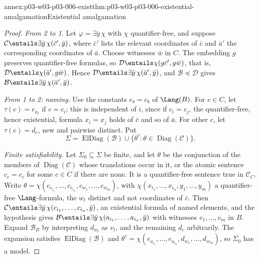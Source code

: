 \begin{annexitem}{annex:p03-w03-p03-006-exist}{thm:p03-w03-p03-006-existential-amalgamation}{Existential amalgamation}
\begin{proof}
\emph{From 2 to 1.}  Let \(\varphi=\exists\bar y\,\chi\) with \(\chi\)
quantifier-free, and suppose
\(\mathcal C\entails\exists\bar y\,\chi(\bar c',\bar y)\), where
\(\bar c'\) lists the relevant coordinates of \(\bar c\) and \(\bar a'\)
the corresponding coordinates of \(\bar a\).  Choose witnesses \(\bar w\)
in \(C\).  The embedding \(g\) preserves quantifier-free formulas, so
\(\mathcal D\entails\chi(g\bar c',g\bar w)\), that is,
\(\mathcal D\entails\chi(\bar a',g\bar w)\).  Hence
\(\mathcal D\entails\exists\bar y\,\chi(\bar a',\bar y)\), and
\(\mathcal B\preccurlyeq\mathcal D\) gives
\(\mathcal B\entails\exists\bar y\,\chi(\bar a',\bar y)\).

\emph{From 1 to 2: naming.}  Use the constants \(e_b=c_b\) of
\(\Lang(B)\).  For \(c\in C\), let \(\tau(c)=e_{a_i}\) if \(c=c_i\); this
is independent of \(i\), since if \(c_i=c_j\), the quantifier-free, hence
existential, formula \(x_i=x_j\) holds of \(\bar c\) and so of \(\bar a\).
For other \(c\), let \(\tau(c)=d_c\), new and pairwise distinct.  Put
\[
 \Sigma=\operatorname{ElDiag}(\mathcal B)
   \cup\{\theta^\tau:\theta\in\operatorname{Diag}(\mathcal C)\}.
\]

\emph{Finite satisfiability.}  Let \(\Sigma_0\subseteq\Sigma\) be finite,
and let \(\theta\) be the conjunction of the members of
\(\operatorname{Diag}(\mathcal C)\) whose translations occur in it,
or the atomic sentence \(c_c=c_c\) for some \(c\in C\) if there are none.
It is a quantifier-free sentence true in \(\mathcal C_C\).  Write
\(\theta=\chi(c_{c_{i_1}},\ldots,c_{c_{i_n}},c_{w_1},\ldots,c_{w_m})\), with
\(\chi(x_{i_1},\ldots,x_{i_n},y_1,\ldots,y_m)\) a quantifier-free
\(\Lang\)-formula, the \(w_l\) distinct and not coordinates of \(\bar c\).
Then \(\mathcal C\entails\exists\bar y\,\chi(c_{i_1},\ldots,c_{i_n},\bar y)\),
an existential formula of named elements, and the hypothesis gives
\(\mathcal B\entails\exists\bar y\,\chi(a_{i_1},\ldots,a_{i_n},\bar y)\)
with witnesses \(v_1,\ldots,v_m\) in \(B\).  Expand \(\mathcal B_B\) by
interpreting \(d_{w_l}\) as \(v_l\), and the remaining \(d_c\)
arbitrarily.  The expansion satisfies \(\operatorname{ElDiag}(\mathcal B)\)
and \(\theta^\tau=\chi(e_{a_{i_1}},\ldots,e_{a_{i_n}},d_{w_1},\ldots,d_{w_m})\),
so \(\Sigma_0\) has a model.


\end{proof}
\end{annexitem}

